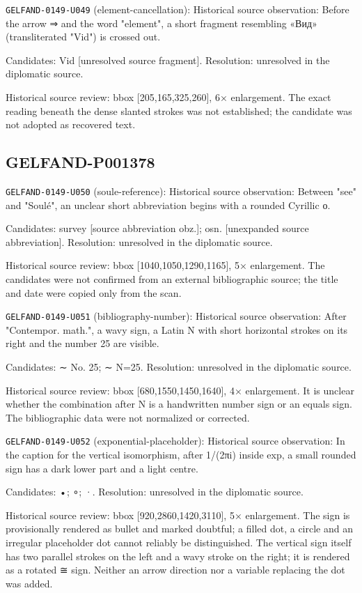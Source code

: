 \noindent\texttt{GELFAND-0149-U049} (element-cancellation): Historical source observation: Before the arrow ⇒ and the word "element", a short fragment resembling «Вид» (transliterated "Vid") is crossed out.\par
Candidates: Vid [unresolved source fragment]. Resolution: unresolved in the diplomatic source.\par
Historical source review: bbox [205,165,325,260], 6× enlargement. The exact reading beneath the dense slanted strokes was not established; the candidate was not adopted as recovered text.\par

\subsection*{GELFAND-P001378}
\noindent\texttt{GELFAND-0149-U050} (soule-reference): Historical source observation: Between "see" and "Soulé", an unclear short abbreviation begins with a rounded Cyrillic о.\par
Candidates: survey [source abbreviation obz.]; osn. [unexpanded source abbreviation]. Resolution: unresolved in the diplomatic source.\par
Historical source review: bbox [1040,1050,1290,1165], 5× enlargement. The candidates were not confirmed from an external bibliographic source; the title and date were copied only from the scan.\par

\noindent\texttt{GELFAND-0149-U051} (bibliography-number): Historical source observation: After "Contempor. math.", a wavy sign, a Latin N with short horizontal strokes on its right and the number 25 are visible.\par
Candidates: ∼ No. 25; ∼ N=25. Resolution: unresolved in the diplomatic source.\par
Historical source review: bbox [680,1550,1450,1640], 4× enlargement. It is unclear whether the combination after N is a handwritten number sign or an equals sign. The bibliographic data were not normalized or corrected.\par

\noindent\texttt{GELFAND-0149-U052} (exponential-placeholder): Historical source observation: In the caption for the vertical isomorphism, after 1/(2πi) inside exp, a small rounded sign has a dark lower part and a light centre.\par
Candidates: •; ∘; ·. Resolution: unresolved in the diplomatic source.\par
Historical source review: bbox [920,2860,1420,3110], 5× enlargement. The sign is provisionally rendered as bullet and marked doubtful; a filled dot, a circle and an irregular placeholder dot cannot reliably be distinguished. The vertical sign itself has two parallel strokes on the left and a wavy stroke on the right; it is rendered as a rotated ≅ sign. Neither an arrow direction nor a variable replacing the dot was added.\par



